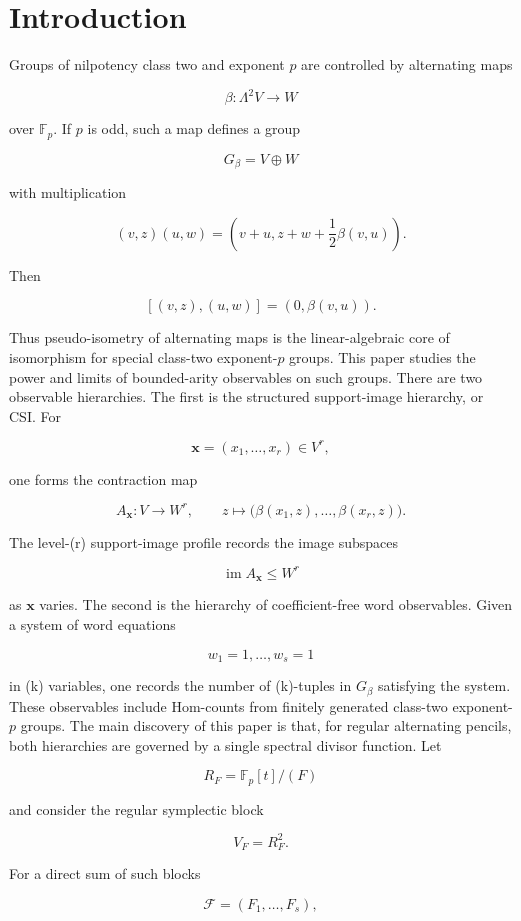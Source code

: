 \documentclass[11pt]{article}
\begin{document}
\section{Introduction}

Groups of nilpotency class two and exponent $p$ are controlled by alternating maps

\[
\beta:\Lambda^2V\to W
\]

over $\mathbb F_p$. If $p$ is odd, such a map defines a group

\[
G_\beta=V\oplus W
\]

with multiplication

\[
(v,z)(u,w)=
\left(
v+u,
z+w+\frac12\beta(v,u)
\right).
\]

Then

\[
[(v,z),(u,w)]=(0,\beta(v,u)).
\]

Thus pseudo-isometry of alternating maps is the linear-algebraic core of isomorphism for special class-two exponent-$p$ groups. This paper studies the power and limits of bounded-arity observables on such groups. There are two observable hierarchies. The first is the structured support-image hierarchy, or CSI. For

\[
\mathbf x=(x_1,\ldots,x_r)\in V^r,
\]

one forms the contraction map

\[
A_{\mathbf x}:V\to W^r,
\qquad
z\mapsto
\bigl(\beta(x_1,z),\ldots,\beta(x_r,z)\bigr).
\]

The level-(r) support-image profile records the image subspaces

\[
\operatorname{im}A_{\mathbf x}\le W^r
\]

as $\mathbf x$ varies. The second is the hierarchy of coefficient-free word observables. Given a system of word equations

\[
w_1=1,\ldots,w_s=1
\]

in (k) variables, one records the number of (k)-tuples in $G_\beta$ satisfying the system. These observables include Hom-counts from finitely generated class-two exponent-$p$ groups. The main discovery of this paper is that, for regular alternating pencils, both hierarchies are governed by a single spectral divisor function. Let

\[
R_F=\mathbb F_p[t]/(F)
\]

and consider the regular symplectic block

\[
V_F=R_F^2.
\]

For a direct sum of such blocks

\[
\mathcal F=(F_1,\ldots,F_s),
\]
\end{document}
